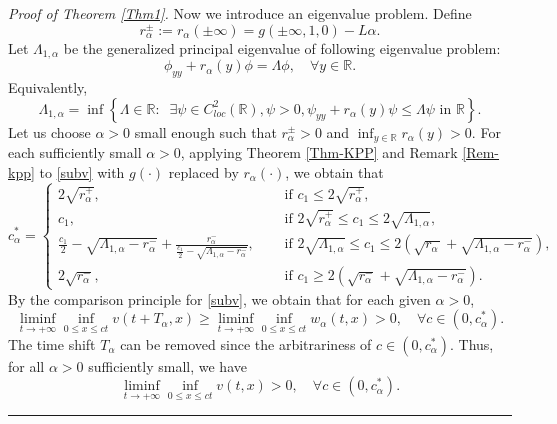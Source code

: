 \documentclass[10pt]{article}
\numberwithin{equation}{section}
\newcommand{\R}{\mathbb{R}}
\newenvironment{proof}[1][Proof]{\noindent\textit{#1.} }{\hfill \rule{0.5em}{0.5em}}
\begin{document}
\begin{proof}[Proof of Theorem \ref{Thm1}]
Now we introduce an eigenvalue problem. Define 
\begin{equation*}
r^{\pm}_\alpha :=   r_{\alpha} (\pm \infty) = g(\pm \infty, 1,0) -L\alpha. 
\end{equation*}
Let $\Lambda_{1, \alpha} $ be the generalized principal eigenvalue of following eigenvalue problem:
\begin{equation*}
\phi_{yy}+  r_{\alpha} (y)  \phi = \Lambda \phi,  \quad \forall y\in \R.
\end{equation*}
Equivalently,
\begin{equation*}
\Lambda_{1, \alpha}  =  \inf\left\{ \Lambda \in \R: \;\;  \exists \psi \in C^2_{loc} (\R), \psi>0,  \psi_{yy} +  r_\alpha (y)  \psi \leq  \Lambda \psi \text{ in } \R  \right\}.
\end{equation*}
 Let us choose $\alpha>0$ small enough such that  $r^{\pm}_{\alpha}>0$ and $\inf_{y\in \R} r_ \alpha (y) >0$. 
 For each sufficiently small $\alpha >0$,     applying Theorem  \ref{Thm-KPP} and Remark \ref{Rem-kpp} to \eqref{subv} with \(g(\cdot)\) replaced by \(r_\alpha(\cdot)\), we obtain that 
\begin{equation*}
c^*_\alpha= \begin{cases}
2\sqrt{r_{\alpha}^+}, & \text{ if } c_1 \leq 2 \sqrt{r_\alpha^+}, \\
c_1,   & \text{ if } 2\sqrt{r_{\alpha}^+} \leq c_1 \leq  2 \sqrt{\Lambda_{1,\alpha} }, \\
\frac{c_1}{2} - \sqrt{\Lambda_{1,\alpha}- r_{\alpha}^{-} }  + \frac{r_{\alpha}^{-}}{\frac{c_1}{2} - \sqrt{\Lambda_{1,\alpha}- r_{\alpha}^{-} }  },   \quad  & \text{ if }   2 \sqrt{\Lambda_{1,\alpha} }  \leq  c_1 \leq 2  \left(  \sqrt{r_{\alpha}^-} + \sqrt{\Lambda_{1,\alpha}-r_{\alpha}^{-}} \right),\\
2\sqrt{r_{\alpha}^-},    & \text{ if } c_1  \geq   2 \left(  \sqrt{r_{\alpha}^-} + \sqrt{\Lambda_{1,\alpha}-r_{\alpha}^{-}} \right).
\end{cases}
\end{equation*}
By the  comparison principle for \eqref{subv},  we obtain that for each given $\alpha>0$, 
\begin{equation}\label{lim}
\liminf_{t\to +\infty} \inf_{ 0 \leq x\leq ct} v(t+T_\alpha, x) \geq  \liminf_{t\to +\infty} \inf_{ 0 \leq x\leq ct} w_\alpha  (t , x) >0,  \quad \forall c\in (0, c^*_\alpha).
\end{equation}
The time shift  $T_{\alpha}$   can be removed   since  the  arbitrariness of $c\in (0, c^*_{\alpha})$.
Thus, for all $\alpha>0$ sufficiently small,  we have 
\begin{equation}\label{lim2}
\liminf_{t\to +\infty} \inf_{ 0 \leq x\leq ct} v(t, x)  >0,  \quad \forall c\in (0, c^*_\alpha).
\end{equation}


\end{proof}
\end{document}
